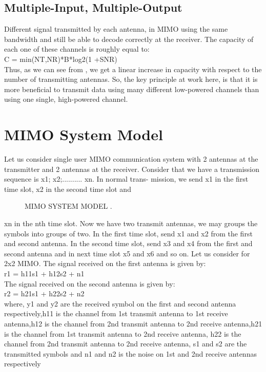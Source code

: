 \documentclass[12pt]{report}
\begin{document}
    \subsection*{Multiple-Input, Multiple-Output}
Different signal transmitted by each antenna, in MIMO using the same
bandwidth and still be able to decode correctly at the receiver. The
capacity of each one of these channels is roughly equal to:\\
C = min(NT,NR)*B*log2(1 +SNR)\\	
Thus, as we can see from , we get a linear increase in capacity with respect to the number of transmitting antennas. So, the key principle at
work here, is that it is more beneficial to transmit data using many different low-powered channels than using one single, high-powered channel.



\section*{MIMO System Model}
Let us consider single user MIMO communication system with 2 antennas at the transmitter and 2 antennas at the receiver. Consider that
we have a transmission sequence is x1; x2;.......... xn. In normal trans-
mission, we send x1 in the first time slot, x2 in the second time slot and
\begin{figure}[!hbt]
		\begin{center}
		\caption{ MIMO SYSTEM MODEL .}
		\label{fig:tf_plot}
		\end{center}
	\end{figure}
xn in the nth time slot. Now we have two transmit antennas, we may
groups the symbols into groups of two. In the first time slot, send x1
and x2 from the first and second antenna. In the second time slot,
send x3 and x4 from the first and second antenna and in next time slot
x5 and x6 and so on. Let us consider for 2x2 MIMO. The signal received
on the first antenna is given by:\\
r1 = h11s1 + h12s2 + n1 \\
The signal received on the second antenna is given by:\\
r2 = h21s1 + h22s2 + n2\\
where, y1 and y2 are the received symbol on the first and second antenna respectively,h11 is the channel from 1st transmit antenna to 1st
receive antenna,h12 is the channel from 2nd transmit antenna to 2nd
receive antenna,h21 is the channel from 1st transmit antenna to 2nd
receive antenna, h22 is the channel from 2nd transmit antenna to 2nd
receive antenna, s1 and s2 are the transmitted symbols and n1 and n2
is the noise on 1st and 2nd receive antennas respectively\\\\\\
\end{document}
